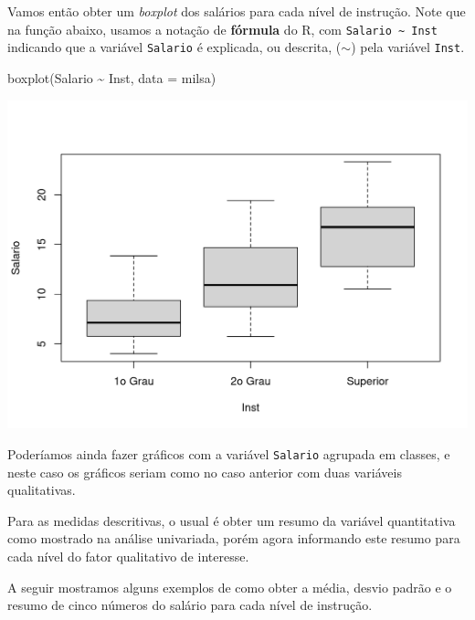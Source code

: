 \documentclass[
  10pt,
  a4paper]{book}
\newenvironment{Shaded}{\begin{snugshade}}{\end{snugshade}}
\newcommand{\AttributeTok}[1]{\textcolor[rgb]{0.77,0.63,0.00}{#1}}
\newcommand{\FunctionTok}[1]{\textcolor[rgb]{0.00,0.00,0.00}{#1}}
\newcommand{\NormalTok}[1]{#1}
\newcommand{\SpecialCharTok}[1]{\textcolor[rgb]{0.00,0.00,0.00}{#1}}
\begin{document}
Vamos então obter um \emph{boxplot} dos salários para cada nível de
instrução. Note que na função abaixo, usamos a notação de \textbf{fórmula} do
R, com \texttt{Salario\ \textasciitilde{}\ Inst} indicando que a variável \texttt{Salario} é explicada,
ou descrita, (\(\sim\)) pela variável \texttt{Inst}.

\begin{Shaded}
\begin{Highlighting}[]
\FunctionTok{boxplot}\NormalTok{(Salario }\SpecialCharTok{\textasciitilde{}}\NormalTok{ Inst, }\AttributeTok{data =}\NormalTok{ milsa)}
\end{Highlighting}
\end{Shaded}

\begin{center}\includegraphics{figures/unnamed-chunk-321-1} \end{center}

Poderíamos ainda fazer gráficos com a variável \texttt{Salario} agrupada
em classes, e neste caso os gráficos seriam como no caso anterior com
duas variáveis qualitativas.

Para as medidas descritivas, o usual é obter um resumo da variável
quantitativa como mostrado na análise univariada, porém agora informando
este resumo para cada nível do fator qualitativo de interesse.

A seguir mostramos alguns exemplos de como obter a média, desvio
padrão e o resumo de cinco números do salário para cada nível de
instrução.
\end{document}
